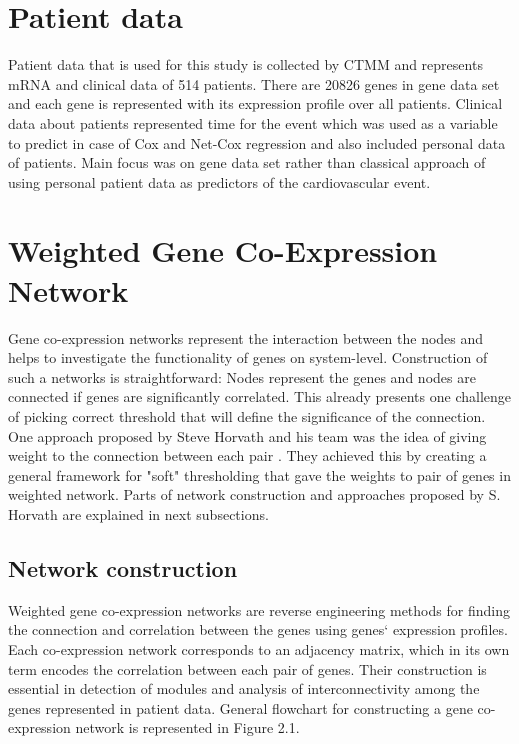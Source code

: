 \documentclass{ba-kecs}
\numberwithin{figure}{section}
\numberwithin{equation}{section}
\begin{document}
\section{Patient data}
Patient data that is used for this study is collected by CTMM and represents mRNA and clinical data of 514 patients. There are 20826 genes in gene data set and each gene is represented with its expression profile over all patients. Clinical data about patients represented time for the event which was used as a variable to predict in case of Cox and Net-Cox regression and also included personal data of patients. Main focus was on gene data set rather than classical approach of using personal patient data as predictors of the cardiovascular event.

\section{Weighted Gene Co-Expression Network}
Gene co-expression networks represent the interaction between the nodes and helps to investigate the functionality of genes on system-level. Construction of such a networks is straightforward: Nodes represent the genes and nodes are connected if genes are significantly correlated. This already presents one challenge of picking correct threshold that will define the significance of the connection. One approach proposed by Steve Horvath and his team was the idea of giving weight to the connection between each pair \cite{wgcna3}. They achieved this by creating a general framework for "soft" thresholding that gave the weights to pair of genes in weighted network. Parts of network construction and approaches proposed by S. Horvath are explained in next subsections.

\subsection{Network construction}

Weighted gene co-expression networks are reverse engineering methods for finding the connection and correlation between the genes using genes` expression profiles. Each co-expression network corresponds to an adjacency matrix, which in its own term encodes the correlation between each pair of genes. Their construction is essential in detection of modules and analysis of interconnectivity among the genes represented in patient data. General flowchart for constructing a gene co-expression network is represented in Figure 2.1.\\ \\
\end{document}
